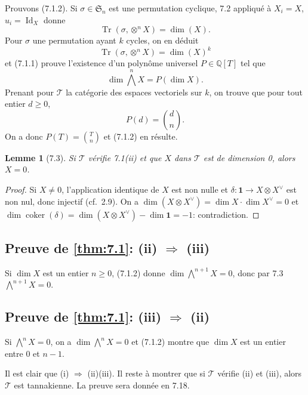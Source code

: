 \documentclass[12pt,a4paper]{article}
\theoremstyle{plain}
\newtheorem{lemma}[theorem]{Lemme}
\theoremstyle{definition}
\DeclareMathOperator{\Id}{Id}
\DeclareMathOperator{\coker}{coker}
\DeclareMathOperator{\Tr}{Tr}
\begin{document}
Prouvons (7.1.2). Si $\sigma \in \mathfrak{S}_n$ est une permutation cyclique, 7.2 appliqué à $X_i = X$, $u_i = \Id_X$ donne
\[
\Tr(\sigma, \otimes^n X) = \dim(X).
\]
Pour $\sigma$ une permutation ayant $k$ cycles, on en déduit
\[
\Tr(\sigma, \otimes^n X) = \dim(X)^k
\]
et (7.1.1) prouve l'existence d'un polynôme universel $P \in \mathbb{Q}[T]$ tel que
\[
\dim \bigwedge^n X = P(\dim X).
\]
Prenant pour $\mathcal{T}$ la catégorie des espaces vectoriels sur $k$, on trouve que pour tout entier $d \geq 0$,
\[
P(d) = \binom{d}{n}.
\]
On a donc $P(T) = \binom{T}{n}$ et (7.1.2) en résulte.

\begin{lemma}[7.3]
Si $\mathcal{T}$ vérifie 7.1\textup{(ii)} et que $X$ dans $\mathcal{T}$ est de dimension 0, alors $X = 0$.
\end{lemma}

\begin{proof}
Si $X \neq 0$, l'application identique de $X$ est non nulle et $\delta : \mathbf{1} \to X \otimes X^\vee$ est non nul, donc injectif (cf.~2.9). On a $\dim(X \otimes X^\vee) = \dim X \cdot \dim X^\vee = 0$ et $\dim \coker(\delta) = \dim(X \otimes X^\vee) - \dim \mathbf{1} = -1$: contradiction.
\end{proof}

\subsection{Preuve de \ref{thm:7.1}: (ii) $\Rightarrow$ (iii)}

Si $\dim X$ est un entier $n \geq 0$, (7.1.2) donne $\dim \bigwedge^{n+1} X = 0$, donc par 7.3 $\bigwedge^{n+1} X = 0$.

\subsection{Preuve de \ref{thm:7.1}: (iii) $\Rightarrow$ (ii)}

Si $\bigwedge^n X = 0$, on a $\dim \bigwedge^n X = 0$ et (7.1.2) montre que $\dim X$ est un entier entre 0 et $n-1$.

Il est clair que (i) $\Rightarrow$ (ii)(iii). Il reste à montrer que si $\mathcal{T}$ vérifie (ii) et (iii), alors $\mathcal{T}$ est tannakienne. La preuve sera donnée en 7.18.

\subsection{}
\end{document}
